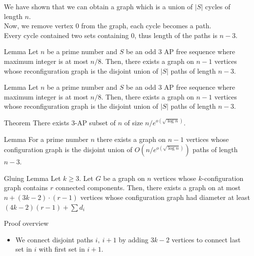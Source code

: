 \begin{frame}{}
    We have shown that we can obtain a graph which is a union of \(|S|\) cycles of length \(n\).\\
    \pause
    \vspace{1em}
    Now, we remove vertex \(0\) from the graph, each cycle becomes a path. \\
    \pause
    \vspace{1em}
    Every cycle contained two sets containing \(0\), thus length of the paths is \(n-3\).
    \pause
    \begin{lemma}{Lemma}
    Let \(n\) be a prime number and \(S\) be an odd 3 AP free sequence where maximum integer is at most \(n/8\). Then, there exists a graph on \(n-1\) vertices whose reconfiguration graph is the disjoint union of \(|S|\) paths of length \(n-3\).
    \end{lemma}
\end{frame}


\begin{frame}{}
    \begin{lemma}{Lemma}
        Let \(n\) be a prime number and \(S\) be an odd 3 AP free sequence where maximum integer is at most \(n/8\). Then, there exists a graph on \(n-1\) vertices whose reconfiguration graph is the disjoint union of \(|S|\) paths of length \(n-3\).
    \end{lemma}
    \begin{theorem}{Theorem}
        There exists 3-AP subset of \(n\) of size \(n/e^{o(\sqrt{\log n})}\).
    \end{theorem}   
    \pause
    \begin{lemma}{Lemma}
        For a prime number \(n\) there exists a graph on \(n-1\) vertices whose configuration graph is the disjoint union of \(O(n/e^{o(\sqrt{\log n})})\) paths of length \(n-3\).
    \end{lemma}
\end{frame}


\begin{frame}{}
    \begin{lemma}{Gluing Lemma}
        Let \(k \geq 3\). Let \(G\) be a graph on \(n\) vertices whose \(k\)-configuration graph contains \(r\) connected components. Then, there exists a graph on at most \(n+(3k-2)\cdot (r-1)\) vertices whose configuration graph had diameter at least \((4k-2)(r-1)+\sum d_i\)
    \end{lemma}
    \begin{heading}{Proof overview}
        \begin{itemize}
            \item We connect disjoint paths \(i, \ i+1\) by adding \(3k-2\)  vertices to connect last set in \(i\) with first set in \(i+1\).
  
        \end{itemize}
    \end{heading}
\end{frame}

